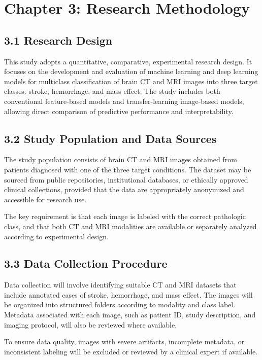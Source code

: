\documentclass[12pt,a4paper]{report}
\begin{document}
\chapter{Chapter 3: Research Methodology}

\section{3.1 Research Design}

This study adopts a quantitative, comparative, experimental research design. It focuses on the development and evaluation of machine learning and deep learning models for multiclass classification of brain CT and MRI images into three target classes: stroke, hemorrhage, and mass effect. The study includes both conventional feature-based models and transfer-learning image-based models, allowing direct comparison of predictive performance and interpretability.

\section{3.2 Study Population and Data Sources}

The study population consists of brain CT and MRI images obtained from patients diagnosed with one of the three target conditions. The dataset may be sourced from public repositories, institutional databases, or ethically approved clinical collections, provided that the data are appropriately anonymized and accessible for research use.

The key requirement is that each image is labeled with the correct pathologic class, and that both CT and MRI modalities are available or separately analyzed according to experimental design.

\section{3.3 Data Collection Procedure}

Data collection will involve identifying suitable CT and MRI datasets that include annotated cases of stroke, hemorrhage, and mass effect. The images will be organized into structured folders according to modality and class label. Metadata associated with each image, such as patient ID, study description, and imaging protocol, will also be reviewed where available.

To ensure data quality, images with severe artifacts, incomplete metadata, or inconsistent labeling will be excluded or reviewed by a clinical expert if available.
\end{document}
